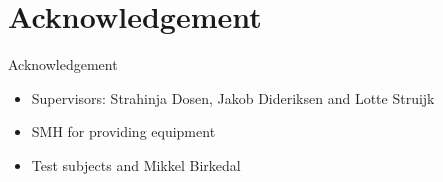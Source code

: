 \documentclass[10pt]{beamer}
\begin{document}

\section{Acknowledgement}
\begin{frame}{Acknowledgement}
\begin{itemize}
	\item Supervisors: Strahinja Dosen, Jakob Dideriksen and Lotte Struijk
	\item SMH for providing equipment
	\item Test subjects and Mikkel Birkedal
\end{itemize}

\end{frame}


{\aauwavesbg
\begin{frame}
\end{frame}}
\end{document}
